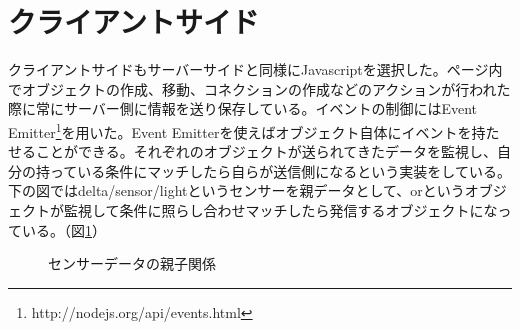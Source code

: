\section{クライアントサイド}
クライアントサイドもサーバーサイドと同様にJavascriptを選択した。ページ内でオブジェクトの作成、移動、コネクションの作成などのアクションが行われた際に常にサーバー側に情報を送り保存している。イベントの制御にはEvent Emitter\footnote{http://nodejs.org/api/events.html}を用いた。Event Emitterを使えばオブジェクト自体にイベントを持たせることができる。それぞれのオブジェクトが送られてきたデータを監視し、自分の持っている条件にマッチしたら自らが送信側になるという実装をしている。下の図ではdelta/sensor/lightというセンサーを親データとして、orというオブジェクトが監視して条件に照らし合わせマッチしたら発信するオブジェクトになっている。（図\ref{fig:image09}）

\begin{figure}[htbp]
  \begin{center}
  \end{center}
  \caption{センサーデータの親子関係}
  \label{fig:image09}
\end{figure}

